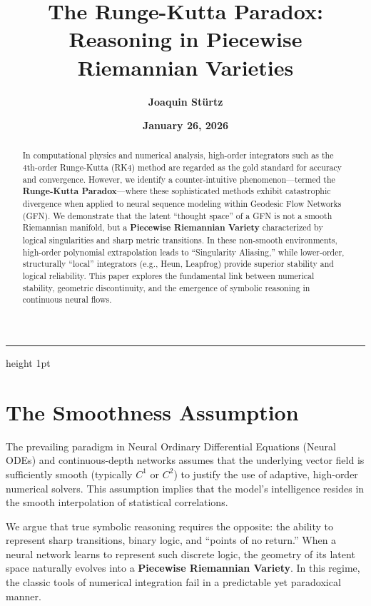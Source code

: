 \documentclass[12pt,a4paper]{article}
\title{\textbf{The Runge-Kutta Paradox: Reasoning in Piecewise\\ Riemannian Varieties}}
\author{\textbf{Joaquin Stürtz}}
\date{\textbf{January 26, 2026}}
\begin{document}
\maketitle
\vspace{-0.5cm}
\begin{center}
\hrule height 1pt
\end{center}
\vspace{0.5cm}

\begin{abstract}
In computational physics and numerical analysis, high-order integrators such as the 4th-order Runge-Kutta (RK4) method are regarded as the gold standard for accuracy and convergence. However, we identify a counter-intuitive phenomenon—termed the \textbf{Runge-Kutta Paradox}—where these sophisticated methods exhibit catastrophic divergence when applied to neural sequence modeling within Geodesic Flow Networks (GFN). We demonstrate that the latent ``thought space'' of a GFN is not a smooth Riemannian manifold, but a \textbf{Piecewise Riemannian Variety} characterized by logical singularities and sharp metric transitions. In these non-smooth environments, high-order polynomial extrapolation leads to ``Singularity Aliasing,'' while lower-order, structurally ``local'' integrators (e.g., Heun, Leapfrog) provide superior stability and logical reliability. This paper explores the fundamental link between numerical stability, geometric discontinuity, and the emergence of symbolic reasoning in continuous neural flows.
\end{abstract}

\vspace{1cm}

\section{The Smoothness Assumption}

The prevailing paradigm in Neural Ordinary Differential Equations (Neural ODEs) and continuous-depth networks assumes that the underlying vector field is sufficiently smooth (typically $C^1$ or $C^2$) to justify the use of adaptive, high-order numerical solvers. This assumption implies that the model's intelligence resides in the smooth interpolation of statistical correlations.

We argue that true symbolic reasoning requires the opposite: the ability to represent sharp transitions, binary logic, and ``points of no return.'' When a neural network learns to represent such discrete logic, the geometry of its latent space naturally evolves into a \textbf{Piecewise Riemannian Variety}. In this regime, the classic tools of numerical integration fail in a predictable yet paradoxical manner.
\end{document}
